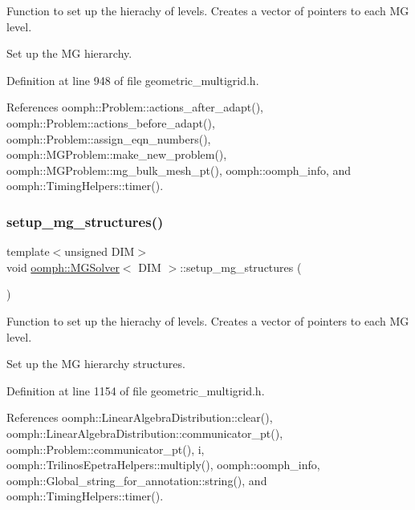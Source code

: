 Function to set up the hierachy of levels. Creates a vector of pointers to each MG level. 

Set up the MG hierarchy. 

Definition at line 948 of file geometric\+\_\+multigrid.\+h.



References oomph\+::\+Problem\+::actions\+\_\+after\+\_\+adapt(), oomph\+::\+Problem\+::actions\+\_\+before\+\_\+adapt(), oomph\+::\+Problem\+::assign\+\_\+eqn\+\_\+numbers(), oomph\+::\+M\+G\+Problem\+::make\+\_\+new\+\_\+problem(), oomph\+::\+M\+G\+Problem\+::mg\+\_\+bulk\+\_\+mesh\+\_\+pt(), oomph\+::oomph\+\_\+info, and oomph\+::\+Timing\+Helpers\+::timer().

\mbox{\label{classoomph_1_1MGSolver_a24b2cc3ce0eefde4eef0b80b38339b38}} 
\subsubsection{\texorpdfstring{setup\+\_\+mg\+\_\+structures()}{setup\_mg\_structures()}}
{\footnotesize\ttfamily template$<$unsigned D\+IM$>$ \\
void \hyperlink{classoomph_1_1MGSolver}{oomph\+::\+M\+G\+Solver}$<$ D\+IM $>$\+::setup\+\_\+mg\+\_\+structures (\begin{DoxyParamCaption}{ }\end{DoxyParamCaption})\hspace{0.3cm}{\ttfamily [private]}}



Function to set up the hierachy of levels. Creates a vector of pointers to each MG level. 

Set up the MG hierarchy structures. 

Definition at line 1154 of file geometric\+\_\+multigrid.\+h.



References oomph\+::\+Linear\+Algebra\+Distribution\+::clear(), oomph\+::\+Linear\+Algebra\+Distribution\+::communicator\+\_\+pt(), oomph\+::\+Problem\+::communicator\+\_\+pt(), i, oomph\+::\+Trilinos\+Epetra\+Helpers\+::multiply(), oomph\+::oomph\+\_\+info, oomph\+::\+Global\+\_\+string\+\_\+for\+\_\+annotation\+::string(), and oomph\+::\+Timing\+Helpers\+::timer().

